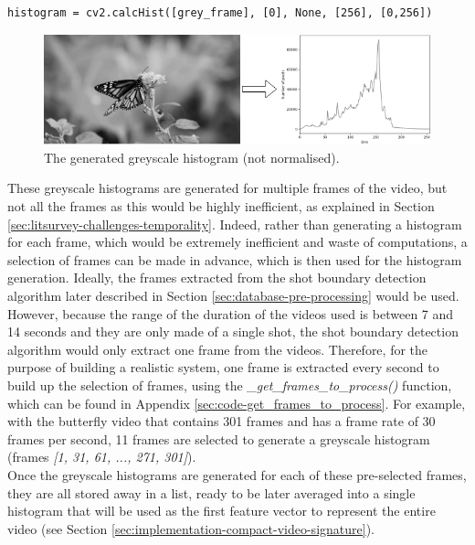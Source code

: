 \begin{lstlisting}[numbers=none]
histogram = cv2.calcHist([grey_frame], [0], None, [256], [0,256])
\end{lstlisting}

\begin{figure}[h] 
\centerline{\includegraphics[width=\textwidth]{figures/implementation/greyscale_not_normalised.png}}
\caption{\label{fig:implementation-greyscale_not_normalised}The generated greyscale histogram (not normalised).}
\end{figure}

These greyscale histograms are generated for multiple frames of the video, but not all the frames as this would be highly inefficient, as explained in Section \ref{sec:litsurvey-challenges-temporality}. Indeed, rather than generating a histogram for each frame, which would be extremely inefficient and waste of computations, a selection of frames can be made in advance, which is then used for the histogram generation. Ideally, the frames extracted from the shot boundary detection algorithm later described in Section \ref{sec:database-pre-processing} would be used. However, because the range of the duration of the videos used is between 7 and 14 seconds and they are only made of a single shot, the shot boundary detection algorithm would only extract one frame from the videos. Therefore, for the purpose of building a realistic system, one frame is extracted every second to build up the selection of frames, using the \textit{\_get\_frames\_to\_process()} function, which can be found in Appendix \ref{sec:code-get_frames_to_process}. For example, with the butterfly video that contains 301 frames and has a frame rate of 30 frames per second, 11 frames are selected to generate a greyscale histogram (frames \textit{[1, 31, 61, ..., 271, 301]}).\\

Once the greyscale histograms are generated for each of these pre-selected frames, they are all stored away in a list, ready to be later averaged into a single histogram that will be used as the first feature vector to represent the entire video (see Section \ref{sec:implementation-compact-video-signature}).

